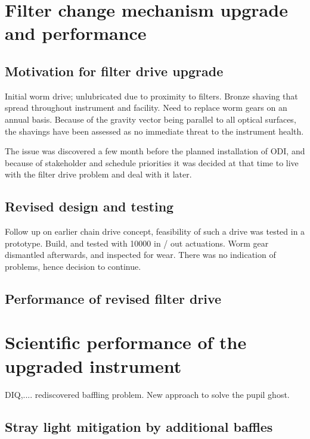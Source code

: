 \documentclass[]{spieman}
\begin{document}
\section{Filter change mechanism upgrade and performance}

\subsection{Motivation for filter drive upgrade} Initial worm drive;
unlubricated due to proximity to filters. Bronze shaving that spread
throughout instrument and facility.  Need to replace worm gears on an annual
basis. Because of the gravity vector being parallel to all optical surfaces,
the shavings have been assessed as no immediate threat to the instrument
health.

The issue was discovered a few month before the planned installation of ODI,
and because of stakeholder and schedule priorities it was decided at that
time to live with the filter drive problem and deal with it later.

\subsection{Revised design and testing}

Follow up on earlier chain drive concept, feasibility of such a drive was
tested in a prototype. Build, and tested with 10000 in / out actuations.
Worm gear dismantled afterwards, and inspected for wear. There was no
indication of problems, hence decision to continue.


\subsection{Performance of revised filter drive}






\section{Scientific performance of the upgraded instrument}

DIQ,.... rediscovered baffling problem. New approach to solve the pupil ghost.


\subsection{Stray light mitigation by additional baffles}
\end{document}
